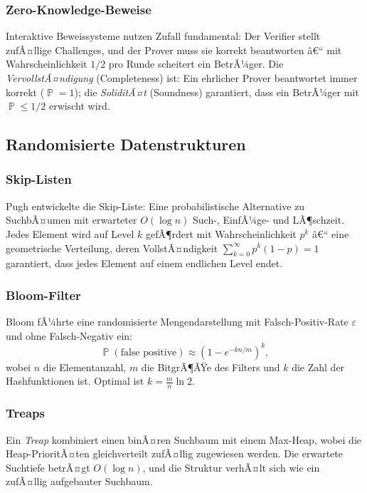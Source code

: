 ﻿\documentclass[12pt,a4paper]{article}
\theoremstyle{definition}
\theoremstyle{plain}
\theoremstyle{remark}
\DeclareMathOperator{\Prob}{\mathbb{P}}
\begin{document}
\subsubsection{Zero-Knowledge-Beweise}
Interaktive Beweissysteme \cite{goldwasser1989knowledge} nutzen Zufall
fundamental: Der Verifier stellt zufÃ¤llige Challenges, und der Prover muss
sie korrekt beantworten â€“ mit Wahrscheinlichkeit $1/2$ pro Runde scheitert
ein BetrÃ¼ger. Die \emph{VervollstÃ¤ndigung} (Completeness) ist: Ein ehrlicher
Prover beantwortet immer korrekt ($\Prob = 1$); die \emph{SoliditÃ¤t}
(Soundness) garantiert, dass ein BetrÃ¼ger mit $\Prob \leq 1/2$ erwischt wird.

\subsection{Randomisierte Datenstrukturen}

\subsubsection{Skip-Listen}
Pugh \cite{pugh1990skip} entwickelte die Skip-Liste: Eine probabilistische
Alternative zu SuchbÃ¤umen mit erwarteter $O(\log n)$ Such-, EinfÃ¼ge- und
LÃ¶schzeit. Jedes Element wird auf Level $k$ gefÃ¶rdert mit Wahrscheinlichkeit
$p^k$ â€“ eine geometrische Verteilung, deren VollstÃ¤ndigkeit
$\sum_{k=0}^{\infty} p^k(1-p) = 1$ garantiert, dass jedes Element auf
einem endlichen Level endet.

\subsubsection{Bloom-Filter}
Bloom \cite{bloom1970space} fÃ¼hrte eine randomisierte Mengendarstellung
mit Falsch-Positiv-Rate $\varepsilon$ und ohne Falsch-Negativ ein:
\[
  \Prob(\text{false positive}) \approx \left(1 - e^{-kn/m}\right)^k,
\]
wobei $n$ die Elementanzahl, $m$ die BitgrÃ¶ÃŸe des Filters und $k$ die Zahl
der Hashfunktionen ist. Optimal ist $k = \frac{m}{n}\ln 2$.

\subsubsection{Treaps}
Ein \emph{Treap} \cite{seidel1996randomized} kombiniert einen binÃ¤ren
Suchbaum mit einem Max-Heap, wobei die Heap-PrioritÃ¤ten gleichverteilt
zufÃ¤llig zugewiesen werden. Die erwartete Suchtiefe betrÃ¤gt $O(\log n)$,
und die Struktur verhÃ¤lt sich wie ein zufÃ¤llig aufgebauter Suchbaum.
\end{document}
